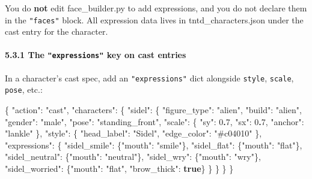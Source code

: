 \documentclass[
  11pt,
]{book}
\newenvironment{Shaded}{}{}
\newcommand{\DataTypeTok}[1]{\textcolor[rgb]{0.56,0.13,0.00}{#1}}
\newcommand{\DecValTok}[1]{\textcolor[rgb]{0.25,0.63,0.44}{#1}}
\newcommand{\ErrorTok}[1]{\textcolor[rgb]{1.00,0.00,0.00}{\textbf{#1}}}
\newcommand{\FunctionTok}[1]{\textcolor[rgb]{0.02,0.16,0.49}{#1}}
\newcommand{\KeywordTok}[1]{\textcolor[rgb]{0.00,0.44,0.13}{\textbf{#1}}}
\newcommand{\StringTok}[1]{\textcolor[rgb]{0.25,0.44,0.63}{#1}}
\begin{document}
You do \textbf{not} edit face\_builder.py to add expressions, and you do
not declare them in the \texttt{"faces"} block. All expression data
lives in tntd\_characters.json under the cast entry for the character.

\paragraph{\texorpdfstring{5.3.1 The \texttt{"expressions"} key on cast
entries}{5.3.1 The "expressions" key on cast entries}}\label{the-expressions-key-on-cast-entries}

In a character's cast spec, add an \texttt{"expressions"} dict alongside
\texttt{style}, \texttt{scale}, \texttt{pose}, etc.:

\begin{Shaded}
\begin{Highlighting}[]
\FunctionTok{\{}
  \DataTypeTok{"action"}\FunctionTok{:} \StringTok{"cast"}\FunctionTok{,}
  \DataTypeTok{"characters"}\FunctionTok{:} \FunctionTok{\{}
    \DataTypeTok{"sidel"}\FunctionTok{:} \FunctionTok{\{}
      \DataTypeTok{"figure\_type"}\FunctionTok{:} \StringTok{"alien"}\FunctionTok{,}
      \DataTypeTok{"build"}\FunctionTok{:}       \StringTok{"alien"}\FunctionTok{,}
      \DataTypeTok{"gender"}\FunctionTok{:}      \StringTok{"male"}\FunctionTok{,}
      \DataTypeTok{"pose"}\FunctionTok{:}        \StringTok{"standing\_front"}\FunctionTok{,}
      \DataTypeTok{"scale"}\FunctionTok{:}       \FunctionTok{\{} \DataTypeTok{"sy"}\FunctionTok{:} \DecValTok{0}\ErrorTok{.}\DecValTok{7}\FunctionTok{,} \DataTypeTok{"sx"}\FunctionTok{:} \DecValTok{0}\ErrorTok{.}\DecValTok{7}\FunctionTok{,} \DataTypeTok{"anchor"}\FunctionTok{:} \StringTok{"lankle"} \FunctionTok{\},}
      \DataTypeTok{"style"}\FunctionTok{:}       \FunctionTok{\{} \DataTypeTok{"head\_label"}\FunctionTok{:} \StringTok{"Sidel"}\FunctionTok{,} \DataTypeTok{"edge\_color"}\FunctionTok{:} \StringTok{"\#c04010"} \FunctionTok{\},}
      \DataTypeTok{"expressions"}\FunctionTok{:} \FunctionTok{\{}
        \DataTypeTok{"sidel\_smile"}\FunctionTok{:}   \FunctionTok{\{}\DataTypeTok{"mouth"}\FunctionTok{:} \StringTok{"smile"}\FunctionTok{\},}
        \DataTypeTok{"sidel\_flat"}\FunctionTok{:}    \FunctionTok{\{}\DataTypeTok{"mouth"}\FunctionTok{:} \StringTok{"flat"}\FunctionTok{\},}
        \DataTypeTok{"sidel\_neutral"}\FunctionTok{:} \FunctionTok{\{}\DataTypeTok{"mouth"}\FunctionTok{:} \StringTok{"neutral"}\FunctionTok{\},}
        \DataTypeTok{"sidel\_wry"}\FunctionTok{:}     \FunctionTok{\{}\DataTypeTok{"mouth"}\FunctionTok{:} \StringTok{"wry"}\FunctionTok{\},}
        \DataTypeTok{"sidel\_worried"}\FunctionTok{:} \FunctionTok{\{}\DataTypeTok{"mouth"}\FunctionTok{:} \StringTok{"flat"}\FunctionTok{,} \DataTypeTok{"brow\_thick"}\FunctionTok{:} \KeywordTok{true}\FunctionTok{\}}
      \FunctionTok{\}}
    \FunctionTok{\}}
  \FunctionTok{\}}
\FunctionTok{\}}
\end{Highlighting}
\end{Shaded}
\end{document}
